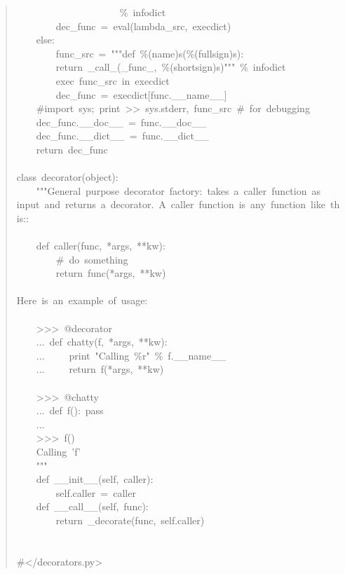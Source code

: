 \documentclass[10pt,a4paper,english]{article}
\begin{document}
\begin{quote}
{~~~~~~~~~~~~~~~~~~~~~{\%}~infodict~\\
~~~~~~~~dec{\_}func~=~eval(lambda{\_}src,~execdict)~\\
~~~~else:~\\
~~~~~~~~func{\_}src~=~"{}"{}"def~{\%}(name)s({\%}(fullsign)s):~\\
~~~~~~~~return~{\_}call{\_}({\_}func{\_},~{\%}(shortsign)s)"{}"{}"~{\%}~infodict~\\
~~~~~~~~exec~func{\_}src~in~execdict~~\\
~~~~~~~~dec{\_}func~=~execdict{[}func.{\_}{\_}name{\_}{\_}]~\\
~~~~{\#}import~sys;~print~>{}>~sys.stderr,~func{\_}src~{\#}~for~debugging~~\\
~~~~dec{\_}func.{\_}{\_}doc{\_}{\_}~=~func.{\_}{\_}doc{\_}{\_}~\\
~~~~dec{\_}func.{\_}{\_}dict{\_}{\_}~=~func.{\_}{\_}dict{\_}{\_}~\\
~~~~return~dec{\_}func~\\
~\\
class~decorator(object):~\\
~~~~"{}"{}"General~purpose~decorator~factory:~takes~a~caller~function~as~\\
input~and~returns~a~decorator.~A~caller~function~is~any~function~like~this::~\\
~\\
~~~~def~caller(func,~*args,~**kw):~\\
~~~~~~~~{\#}~do~something~\\
~~~~~~~~return~func(*args,~**kw)~\\
~~~~~\\
Here~is~an~example~of~usage:~\\
~\\
~~~~>{}>{}>~@decorator~\\
~~~~...~def~chatty(f,~*args,~**kw):~\\
~~~~...~~~~~print~"Calling~{\%}r"~{\%}~f.{\_}{\_}name{\_}{\_}~\\
~~~~...~~~~~return~f(*args,~**kw)~\\
~~~~~\\
~~~~>{}>{}>~@chatty~\\
~~~~...~def~f():~pass~\\
~~~~...~\\
~~~~>{}>{}>~f()~\\
~~~~Calling~'f'~\\
~~~~"{}"{}"~\\
~~~~def~{\_}{\_}init{\_}{\_}(self,~caller):~\\
~~~~~~~~self.caller~=~caller~\\
~~~~def~{\_}{\_}call{\_}{\_}(self,~func):~\\
~~~~~~~~return~{\_}decorate(func,~self.caller)~\\
~\\
~\\
{\#}</decorators.py>
}\end{quote}
\end{document}
